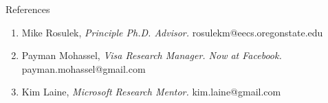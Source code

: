 \documentclass{resume} %
\begin{document}

\begin{rSection}{References}
	
	\begin{enumerate}[label=R\arabic* --]
		
		\item Mike Rosulek, \emph{Principle Ph.D. Advisor.} rosulekm@eecs.oregonstate.edu
		
		\item Payman Mohassel,  \emph{Visa Research Manager. Now at Facebook.} payman.mohassel@gmail.com 
		
		\item Kim Laine, \emph{Microsoft Research Mentor. } kim.laine@gmail.com
		
		
	\end{enumerate}
	
\end{rSection}






\end{document}
